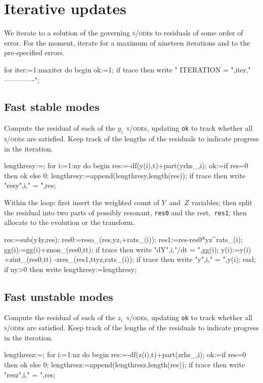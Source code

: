\documentclass[11pt,a5paper]{article}
\def\sde{\textsc{s/ode}}
\begin{document}
\section{Iterative updates}

We iterate to a solution of the governing \sde{}s to residuals of some order of error.
For the moment, iterate for a maximum of nineteen iterations and to the pre-specified errors.
\begin{reduce}
for iter:=1:maxiter do begin
  ok:=1;
  if trace then write "
  ITERATION = ",iter,"
  -------------";
\end{reduce}



\subsection{Fast stable modes}

Compute the residual of each of the $y_i$~\sde{}s, updating \verb|ok| to track whether all \sde{}s are satisfied.  Keep track of the lengths of the residuals to indicate progress in the iteration.
\begin{reduce}
  lengthresy:={};
  for i:=1:ny do begin  
    res:=-df(y(i),t)+part(yrhs_,i);
    ok:=if res=0 then ok else 0;
    lengthresy:=append(lengthresy,{length(res)});
    if trace then write "resy",i," = ",res;
\end{reduce}

Within the loop: first insert the weighted count of $Y$~and~$Z$ variables;
then split the residual into two parts of possibly resonant, \verb|res0| and the rest,~\verb|res1|; then allocate to the evolution or the transform.
\begin{reduce}
    res:=sub(y4y,res);
    res0:=reso_(res,yz,+rats_(i));
    res1:=res-res0*yz^rats_(i);
    gg(i):=gg(i)+znon_(res0,tt);
    if trace then write "dY",i,"/dt = ",gg(i);
    y(i):=y(i) +zint_(res0,tt) -zres_(res1,ttyz,rats_(i));
    if trace then write "y",i," = ",y(i);
  end;
  if ny>0 then write lengthresy:=lengthresy;
\end{reduce}



\subsection{Fast unstable modes}

Compute the residual of each of the $z_i$~\sde{}s, updating \verb|ok| to track whether all \sde{}s are satisfied.  Keep track of the lengths of the residuals to indicate progress in the iteration.
\begin{reduce}
  lengthresz:={};
  for i:=1:nz do begin  
    res:=-df(z(i),t)+part(zrhs_,i);
    ok:=if res=0 then ok else 0;
    lengthresz:=append(lengthresz,{length(res)});
    if trace then write "resz",i," = ",res;
\end{reduce}
\end{document}
